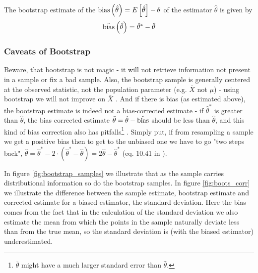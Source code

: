 The bootstrap estimate of the $\operatorname{bias}\left(\hat{\theta}\right) = E\left[ \hat{\theta} \right] - \theta$ of the estimator $\hat{\theta}$ is given by
\begin{equation}
    \hat{\operatorname{bias}}\left(\hat{\theta}\right) = \hat{\theta}^{*} - \hat{\theta}
\end{equation}


\subsubsection{Caveats of Bootstrap\skipthis}
Beware, that bootstrap is not magic - it will not retrieve information not present in
a sample or fix a bad sample. Also, the bootstrap sample is generally centered at
the observed statistic, not the population parameter (e.g. $\bar{X}$ not $\mu$) - using
bootstrap we will not improve on $\bar{X}$ \citep[section 2.3 (also see there for exceptions)]{tim15}. And if there is bias
(as estimated above), the bootstrap estimate is indeed not a bias-corrected estimate - if $\hat{\theta}^{*}$
is greater than $\hat{\theta}$, the bias corrected estimate $\bar{\theta} = \hat{\theta} - \hat{\operatorname{bias}}$ should be less than $\hat{\theta}$,
and this kind of bias correction also has pitfalls\footnote{$\bar{\theta}$ might have a much larger standard error than $\hat{\theta}$.} \citep[chapter 10.6, p. 138]{Efron1994}. Simply put, if from resampling a sample we get a positive bias
then to get to the unbiased one we have to go "two steps back", $\hat{\theta} = \hat{\theta}^{*} - 2 \cdot (\hat{\theta}^{*} - \hat{\theta}) = 2\hat{\theta}-\hat{\theta}^{*}$ (eq. 10.41 in \cite{Efron1994}).

In figure \ref{fig:bootstrap_samples} we illustrate that as the sample carries distributional information so do the bootstrap samples. In figure \ref{fig:boots_corr} we illustrate the difference between the sample
estimate, bootstrap estimate and corrected estimate for a biased estimator, the standard deviation. Here the bias comes from the fact that in the calculation
of the standard deviation we also estimate the mean from which the points in the sample naturally deviate less than from the true mean, so the
standard deviation is (with the biased estimator) underestimated.

